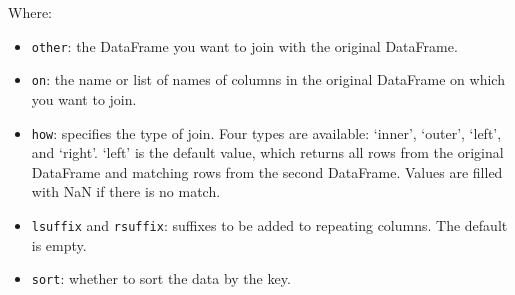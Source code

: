\documentclass[
  english,
  letterpaper,
  DIV=11,
  numbers=noendperiod]{scrreprt}
\providecommand{\tightlist}{%
  \setlength{\itemsep}{0pt}\setlength{\parskip}{0pt}}
\begin{document}
Where:

\begin{itemize}
\tightlist
\item
  \texttt{other}: the DataFrame you want to join with the original
  DataFrame.
\item
  \texttt{on}: the name or list of names of columns in the original
  DataFrame on which you want to join.
\item
  \texttt{how}: specifies the type of join. Four types are available:
  `inner', `outer', `left', and `right'. `left' is the default value,
  which returns all rows from the original DataFrame and matching rows
  from the second DataFrame. Values are filled with NaN if there is no
  match.
\item
  \texttt{lsuffix} and \texttt{rsuffix}: suffixes to be added to
  repeating columns. The default is empty.
\item
  \texttt{sort}: whether to sort the data by the key.
\end{itemize}
\end{document}
